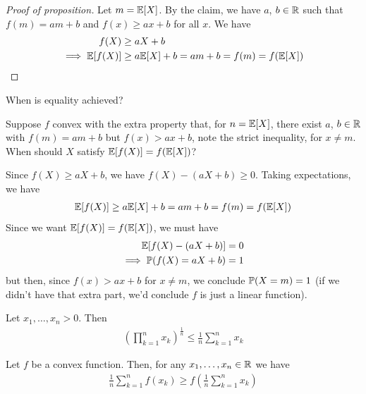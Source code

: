 \documentclass{../../template/note}
\begin{document}
    \begin{proof}[Proof of proposition]
        Let \(m = \mathbb E[X]\). By the claim, we have \(a\), \(b \in \mathbb R\) such that \(f(m) = am + b\) and \(f(x) \geq ax + b\) for all \(x\). We have
        \begin{align*}
            f(X) &\geq aX + b \\
            \implies \mathbb E[f(X)] &\geq a\mathbb E[X] + b = am + b = f(m) = f(\mathbb E[X])
        \end{align*}
    \end{proof}
    
    \begin{remark*}
        When is equality achieved?
        
        Suppose \(f\) convex with the extra property that, for \(n = \mathbb E[X]\), there exist \(a\), \(b \in \mathbb R\) with \(f(m) = am + b\) but \(f(x) > ax + b\), note the strict inequality, for \(x \neq m\). When should \(X\) satisfy \(\mathbb E[f(X)] = f(\mathbb E[X])\)?

        Since \(f(X) \geq aX + b\), we have \(f(X) - (aX + b) \geq 0\). Taking expectations, we have
        \begin{align*}
            \mathbb E[f(X)] \geq a\mathbb E[X] + b = am + b = f(m) = f(\mathbb E[X])
        \end{align*}
        Since we want \(\mathbb E[f(X)] = f(\mathbb E[X])\), we must have
        \begin{align*}
            \mathbb E[f(X) - (aX + b)] &= 0 \\
            \implies \mathbb P(f(X) = aX + b) &= 1
        \end{align*}
        but then, since \(f(x) > ax + b\) for \(x \neq m\), we conclude \(\mathbb P(X = m) = 1\) (if we didn't have that extra part, we'd conclude \(f\) is just a linear function).
        
    \end{remark*}


    \begin{proposition}[AM-GM inequality]
        Let \(x_1, \dots, x_n > 0\). Then 
        \begin{align*}
            \left(\prod_{k=1}^n x_k\right)^{\frac 1 n} \leq \frac 1 n \sum_{k=1}^n x_k
        \end{align*}
    \end{proposition}
    
    \begin{lemma}
        Let \(f\) be a convex function. Then, for any \(x_1, \dots, x_n \in \mathbb R\) we have
        \begin{align*}
            \frac 1 n \sum_{k=1}^n f(x_k) \geq f\left(\frac 1 n \sum_{k=1}^n x_k\right)
        \end{align*}
    \end{lemma}
    
\end{document}
